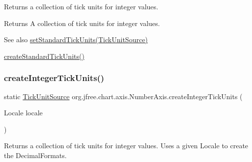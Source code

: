 Returns a collection of tick units for integer values.

\begin{DoxyReturn}{Returns}
A collection of tick units for integer values.
\end{DoxyReturn}
\begin{DoxySeeAlso}{See also}
\mbox{\hyperlink{classorg_1_1jfree_1_1chart_1_1axis_1_1_value_axis_ac84e1ffa28cdea7b355306ae472d21a2}{set\+Standard\+Tick\+Units(\+Tick\+Unit\+Source)}} 

\mbox{\hyperlink{classorg_1_1jfree_1_1chart_1_1axis_1_1_number_axis_ac9f43609e3f99cac998a2ece777809c6}{create\+Standard\+Tick\+Units()}} 
\end{DoxySeeAlso}
\mbox{\label{classorg_1_1jfree_1_1chart_1_1axis_1_1_number_axis_ab324d311c92e63cdead809641c8a39d2}} 
\subsubsection{\texorpdfstring{create\+Integer\+Tick\+Units()}{createIntegerTickUnits()}\hspace{0.1cm}{\footnotesize\ttfamily [2/2]}}
{\footnotesize\ttfamily static \mbox{\hyperlink{interfaceorg_1_1jfree_1_1chart_1_1axis_1_1_tick_unit_source}{Tick\+Unit\+Source}} org.\+jfree.\+chart.\+axis.\+Number\+Axis.\+create\+Integer\+Tick\+Units (\begin{DoxyParamCaption}\item[{Locale}]{locale }\end{DoxyParamCaption})\hspace{0.3cm}{\ttfamily [static]}}

Returns a collection of tick units for integer values. Uses a given Locale to create the Decimal\+Formats.


